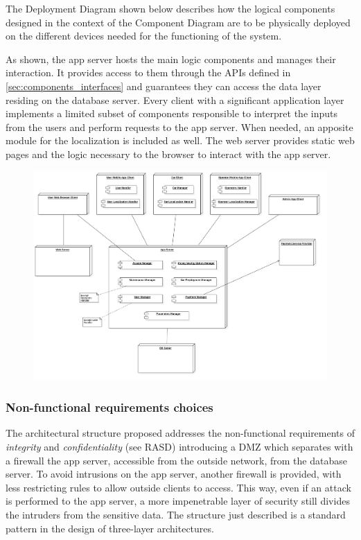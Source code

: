 The Deployment Diagram shown below describes how the logical components designed in the context of the Component Diagram are to be physically deployed on the different devices needed for the functioning of the system.

As shown, the app server hosts the main logic components and manages their interaction. It provides access to them through the APIs defined in \autoref{sec:components_interfaces} and guarantees they can access the data layer residing on the database server.\newline
Every client with a significant application layer implements a limited subset of components responsible to interpret the inputs from the users and perform requests to the app server. When needed, an apposite module for the localization is included as well.\newline
The web server provides static web pages and the logic necessary to the browser to interact with the app server.

\begin{figure}
	\includegraphics[width=\hsize, center]{img/deployment_diagrams/global.png}
\end{figure}

\subsubsection{Non-functional requirements choices}
	The architectural structure proposed addresses the non-functional requirements of \textit{integrity} and \textit{confidentiality} (see RASD) introducing a DMZ which separates with a firewall the app server, accessible from the outside network, from the database server. To avoid intrusions on the app server, another firewall is provided, with less restricting rules to allow outside clients to access. This way, even if an attack is performed to the app server, a more impenetrable layer of security still divides the intruders from the sensitive data. The structure just described is a standard pattern in the design of three-layer architectures.

